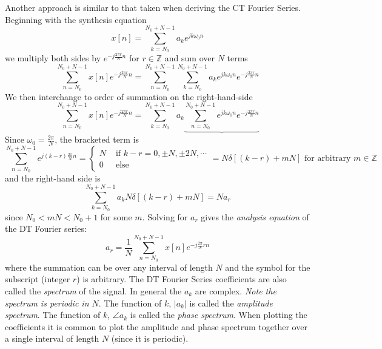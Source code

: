 Another approach is similar to that taken when deriving the CT Fourier Series. Beginning with the synthesis equation
\[  
x[n] = \sum\limits_{k = N_0}^{N_0 + N-1} a_k e^{jk\omega_0n}
\]
we multiply both sides by $e^{-j\frac{2\pi r}{N} n}$ for $r \in \mathbb{Z}$ and sum over $N$ terms
\[  
\sum\limits_{n = N_0}^{N_0 + N-1} x[n]e^{-j\frac{2\pi r}{N} n} = \sum\limits_{n = N_0}^{N_0 + N-1} \sum\limits_{k = N_0}^{N_0 + N-1} a_k e^{jk\omega_0n}e^{-j\frac{2\pi r}{N} n}
\]
We then interchange to order of summation on the right-hand-side
\[  
\sum\limits_{n = N_0}^{N_0 + N-1} x[n]e^{-j\frac{2\pi r}{N} n} =  \sum\limits_{k = N_0}^{N_0 + N-1} a_k \underbrace{\sum\limits_{n = N_0}^{N_0 + N-1} e^{jk\omega_0n}e^{-j\frac{2\pi r}{N} n}}
\]
Since $\omega_0 = \frac{2\pi}{N}$, the bracketed term is
\[
\sum\limits_{n = N_0}^{N_0 + N-1} e^{j(k-r)\frac{2\pi}{N} n} = \begin{cases}
  N & \mbox{ if } k-r = 0, \pm N, \pm 2N, \cdots\\
  0 & \mbox{ else }
\end{cases}
= N\delta[(k-r) + mN] \mbox{ for arbitrary } m \in \mathbb{Z}
\]
and the right-hand side is
\[
\sum\limits_{k = N_0}^{N_0 + N-1} a_k N \delta[(k-r) + mN] = Na_r 
\]
since $N_0 < mN < N_0 + 1$ for some $m$. Solving for $a_r$ gives the \emph{analysis equation} of the DT Fourier series:
\[
\boxed{a_r = \frac{1}{N} \sum\limits_{n = N_0}^{N_0+N-1} x[n]e^{-j\frac{2\pi}{N} r n }}
\]
where the summation can be over any interval of length $N$ and the symbol for the subscript (integer $r$) is arbitrary. The DT Fourier Series coefficients are also called the \emph{spectrum} of the signal. In general the $a_k$ are complex. \emph{Note the spectrum is periodic in $N$}. The function of $k$, $|a_k|$ is called the \emph{amplitude spectrum}. The function of $k$, $\angle a_k$ is called the \emph{phase spectrum}. When plotting the coefficients it is common to plot the amplitude and phase spectrum together over a single interval of length $N$ (since it is periodic).

